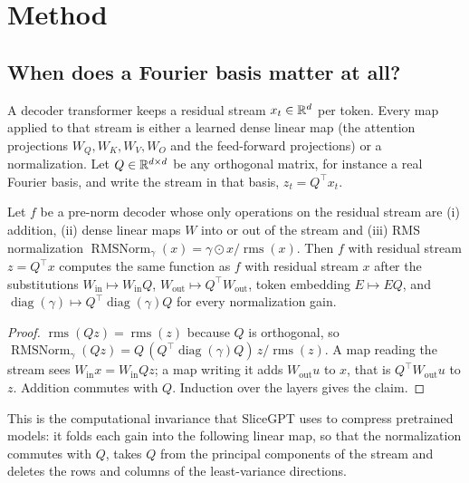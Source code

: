 
\section{Method}
\label{sec:method}

\subsection{When does a Fourier basis matter at all?}
\label{sec:absorption}

A decoder transformer keeps a residual stream $x_t\in\mathbb{R}^{d}$ per token. Every
map applied to that stream is either a learned dense linear map (the
attention projections $W_Q,W_K,W_V,W_O$ and the feed-forward projections) or
a normalization. Let $Q\in\mathbb{R}^{d\times d}$ be any orthogonal matrix, for
instance a real Fourier basis, and write the stream in that basis, $z_t=Q^\top
x_t$.

\begin{proposition}
\label{prop:absorption}
Let $f$ be a pre-norm decoder whose only operations on the residual stream are
(i) addition, (ii) dense linear maps $W$ into or out of the stream and (iii)
RMS normalization $\operatorname{RMSNorm}_\gamma(x)=\gamma\odot x/\operatorname{rms}(x)$.
Then $f$ with residual stream $z=Q^\top x$ computes the same function as $f$
with residual stream $x$ after the substitutions $W_{\mathrm{in}}\mapsto
W_{\mathrm{in}}Q$, $W_{\mathrm{out}}\mapsto Q^\top W_{\mathrm{out}}$, token
embedding $E\mapsto EQ$, and $\operatorname{diag}(\gamma)\mapsto
Q^\top\operatorname{diag}(\gamma)Q$ for every normalization gain.
\end{proposition}

\begin{proof}
$\operatorname{rms}(Qz)=\operatorname{rms}(z)$ because $Q$ is orthogonal, so
$\operatorname{RMSNorm}_\gamma(Qz)=Q\,(Q^\top\operatorname{diag}(\gamma)Q)\,z/\operatorname{rms}(z)$.
A map reading the stream sees $W_{\mathrm{in}}x=W_{\mathrm{in}}Qz$; a map
writing it adds $W_{\mathrm{out}}u$ to $x$, that is $Q^\top W_{\mathrm{out}}u$
to $z$. Addition commutes with $Q$. Induction over the layers gives the claim.
\end{proof}

This is the computational invariance that SliceGPT \citep{ashkboos2024slicegpt}
uses to compress pretrained models: it folds each gain into the following
linear map, so that the normalization commutes with $Q$, takes $Q$ from the
principal components of the stream and deletes the rows and columns of the
least-variance directions.

